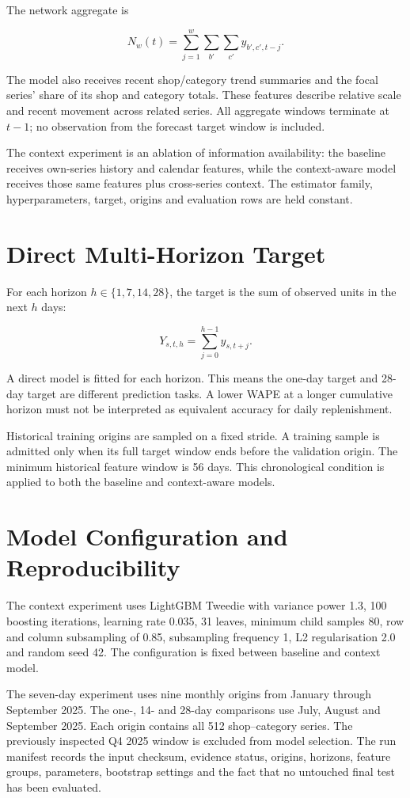 \documentclass[a4paper,11pt,oneside]{book}
\theoremstyle{plain}
\theoremstyle{definition}
\theoremstyle{remark}
\begin{document}
The network aggregate is

\[
N_w(t)=
\sum_{j=1}^{w}\sum_{b'}\sum_{c'}y_{b',c',t-j}.
\]

The model also receives recent shop/category trend summaries and the
focal series' share of its shop and category totals. These features
describe relative scale and recent movement across related series.
All aggregate windows terminate at \(t-1\); no observation from the
forecast target window is included.

The context experiment is an ablation of information availability:
the baseline receives own-series history and calendar features, while
the context-aware model receives those same features plus cross-series context.
The estimator family, hyperparameters, target, origins and evaluation
rows are held constant.

\section{Direct Multi-Horizon Target}

For each horizon \(h\in\{1,7,14,28\}\), the target is the sum of observed
units in the next \(h\) days:

\[
Y_{s,t,h}=\sum_{j=0}^{h-1}y_{s,t+j}.
\]

A direct model is fitted for each horizon. This means the one-day target
and 28-day target are different prediction tasks. A lower WAPE at a
longer cumulative horizon must not be interpreted as equivalent accuracy
for daily replenishment.

Historical training origins are sampled on a fixed stride. A training
sample is admitted only when its full target window ends before the
validation origin. The minimum historical feature window is 56 days.
This chronological condition is applied to both the baseline and
context-aware models.

\section{Model Configuration and Reproducibility}

The context experiment uses LightGBM Tweedie with variance power 1.3,
100 boosting iterations, learning rate 0.035, 31 leaves, minimum child
samples 80, row and column subsampling of 0.85, subsampling frequency
1, L2 regularisation 2.0 and random seed 42. The configuration is
fixed between baseline and context model.

The seven-day experiment uses nine monthly origins from January through
September 2025. The one-, 14- and 28-day comparisons use July, August
and September 2025. Each origin contains all 512 shop--category series.
The previously inspected Q4 2025 window is excluded from model selection.
The run manifest records the input checksum, evidence status, origins,
horizons, feature groups, parameters, bootstrap settings and the fact
that no untouched final test has been evaluated.
\end{document}
